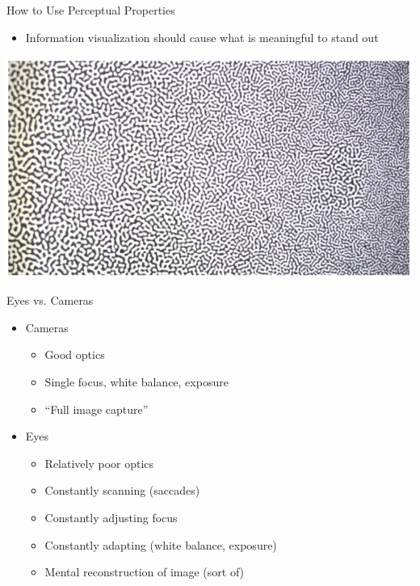 \documentclass{beamer}
\begin{document}
\begin{frame}{How to Use Perceptual Properties} 
    \begin{itemize}
        \item Information visualization should cause what is meaningful to stand out
    \end{itemize}
    \begin{center}
        \includegraphics[scale=0.3]{perceptualProperties.png}
    \end{center}
\end{frame}  


\begin{frame}{Eyes vs. Cameras} 
    \begin{itemize}
        \item Cameras
        \begin{itemize}
            \item Good optics
            \item Single focus, white balance, exposure
            \item ``Full image capture''
        \end{itemize}
        \item Eyes
        \begin{itemize}
            \item Relatively poor optics
            \item Constantly scanning (saccades)
            \item Constantly adjusting focus
            \item Constantly adapting (white balance, exposure)
            \item Mental reconstruction of image (sort of)
        \end{itemize}
    \end{itemize}
\end{frame}  
\end{document}
